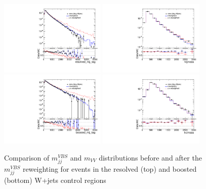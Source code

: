 \begin{figure}[!ht]
	\centering
	\includegraphics[width=0.45\textwidth]{Chapter5/resolved_mjj_tag_sub.pdf}	\includegraphics[width=0.45\textwidth]{Chapter5/lvjjmass_sub.pdf}
	\includegraphics[width=0.45\textwidth]{Chapter5/boosted_mjj_tag_sub.pdf}
	\includegraphics[width=0.45\textwidth]{Chapter5/lvJmass_sub.pdf}
	\caption{\label{Fig:mjjtag_rwt_Wjets}
		Comparison of $m_{jj}^{VBS}$ and $m_{VV}$ distributions before and after the $m_{jj}^{VBS}$ reweighting for events in the resolved (top) and boosted (bottom) W+jets control regions 
	}
\end{figure}
